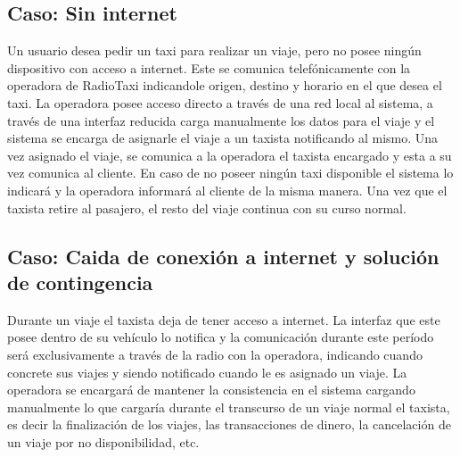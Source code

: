 \subsection{Caso: Sin internet}
Un usuario desea pedir un taxi para realizar un viaje, pero no posee ningún dispositivo con acceso a internet. Este se comunica telefónicamente con la operadora de RadioTaxi indicandole origen, destino y horario en el que desea el taxi. La operadora posee acceso directo a través de una red local al sistema, a través de una interfaz reducida carga manualmente los datos para el viaje y el sistema se encarga de asignarle el viaje a un taxista notificando al mismo. Una vez asignado el viaje, se comunica a la operadora el taxista encargado y esta a su vez comunica al cliente. En caso de no poseer ningún taxi disponible el sistema lo indicará y la operadora informará al cliente de la misma manera. Una vez que el taxista retire al pasajero, el resto del viaje continua con su curso normal.

\subsection{Caso: Caida de conexión a internet y solución de contingencia}
Durante un viaje el taxista deja de tener acceso a internet. La interfaz que este posee dentro de su veh\'iculo lo notifica y la comunicación durante este per\'iodo será exclusivamente a través de la radio con la operadora, indicando cuando concrete sus viajes y siendo notificado cuando le es asignado un viaje. La operadora se encargará de mantener la consistencia en el sistema cargando manualmente lo que cargar\'ia durante el transcurso de un viaje normal el taxista, es decir la finalización de los viajes, las transacciones de dinero, la cancelación de un viaje por no disponibilidad, etc.


